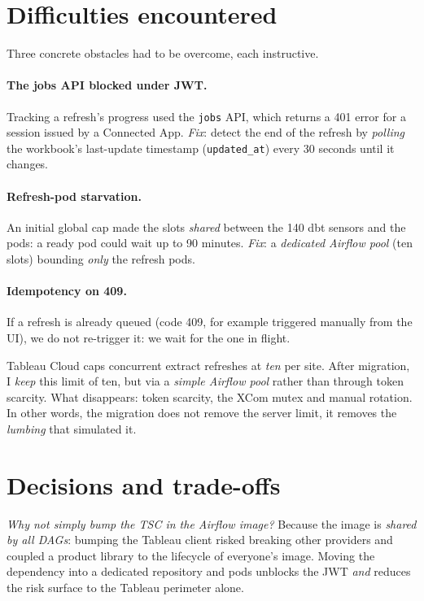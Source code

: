 \section{Difficulties encountered}

Three concrete obstacles had to be overcome, each instructive.

\paragraph{The jobs API blocked under JWT.} Tracking a refresh's progress used the \texttt{jobs} API, which returns a 401 error for a session issued by a Connected App. \emph{Fix}: detect the end of the refresh by \emph{polling} the workbook's last-update timestamp (\texttt{updated\_at}) every 30 seconds until it changes.

\paragraph{Refresh-pod starvation.} An initial global cap made the slots \emph{shared} between the 140 dbt sensors and the pods: a ready pod could wait up to 90 minutes. \emph{Fix}: a \emph{dedicated Airflow pool} (ten slots) bounding \emph{only} the refresh pods.

\paragraph{Idempotency on 409.} If a refresh is already queued (code 409, for example triggered manually from the UI), we do not re-trigger it: we wait for the one in flight.

\begin{keybox}
Tableau Cloud caps concurrent extract refreshes at \emph{ten} per site. After migration, I \emph{keep} this limit of ten, but via a \emph{simple Airflow pool} rather than through token scarcity. What disappears: token scarcity, the XCom mutex and manual rotation. In other words, the migration does not remove the server limit, it removes the \emph{ lumbing} that simulated it.
\end{keybox}

\section{Decisions and trade-offs}

\emph{Why not simply bump the TSC in the Airflow image?} Because the image is \emph{shared by all DAGs}: bumping the Tableau client risked breaking other providers and coupled a product library to the lifecycle of everyone's image. Moving the dependency into a dedicated repository and pods unblocks the JWT \emph{and} reduces the risk surface to the Tableau perimeter alone.

